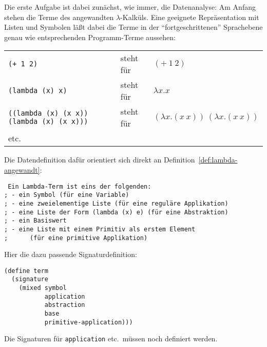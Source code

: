 Die erste Aufgabe ist dabei zunächst, wie immer, die Datenanalyse: Am
Anfang stehen die Terme des angewandten $\lambda$-Kalküls.  Eine
geeignete Repräsentation mit Listen und Symbolen läßt dabei die Terme
in der "`fortgeschrittenen"' Sprachebene genau wie entsprechenden
Programm-Terme aussehen:

\noindent\begin{tabular}{lll}
  \texttt{(+ 1 2)} & steht für & $(+~1~2)$\\
  \texttt{(lambda (x) x)} & steht für & $\lambda x.x$\\
  \texttt{((lambda (x) (x x)) (lambda (x) (x x)))} & steht für &
  $(\lambda x.(x~x))~(\lambda x.(x~x))$\\
  etc.
\end{tabular}

Die Datendefinition dafür orientiert sich direkt an
Definition~\ref{def:lambda-angewandt}:
%
\begin{verbatim}
 Ein Lambda-Term ist eins der folgenden:
; - ein Symbol (für eine Variable)
; - eine zweielementige Liste (für eine reguläre Applikation)
; - eine Liste der Form (lambda (x) e) (für eine Abstraktion)
; - ein Basiswert
; - eine Liste mit einem Primitiv als erstem Element
;      (für eine primitive Applikation)
\end{verbatim}
%
Hier die dazu passende Signaturdefinition:
%
\begin{verbatim}
(define term
  (signature
    (mixed symbol
           application
           abstraction
           base
           primitive-application)))
\end{verbatim}
%
Die Signaturen für \texttt{application} etc.\ müssen noch definiert
werden.

